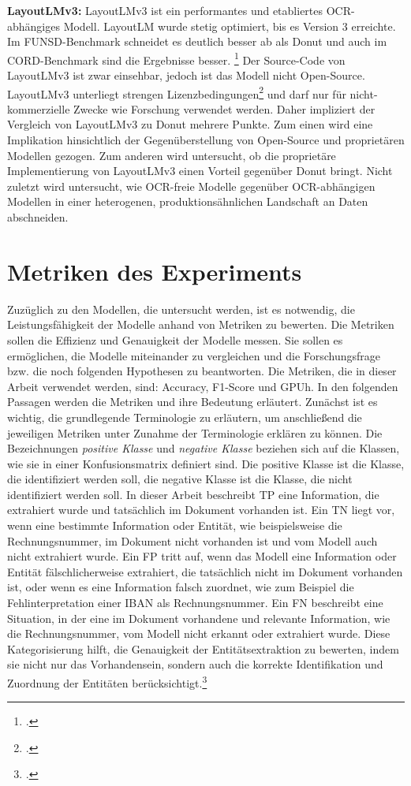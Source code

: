 \textbf{LayoutLMv3:} LayoutLMv3 ist ein performantes und etabliertes OCR-abhängiges Modell. LayoutLM wurde stetig optimiert, bis es Version 3 erreichte. Im FUNSD-Benchmark schneidet es deutlich besser ab als Donut und auch im CORD-Benchmark sind die Ergebnisse besser. \footcites[Vgl. dazu ausführlich][]{huang_layoutlmv3_2022} Der Source-Code von LayoutLMv3 ist zwar einsehbar, jedoch ist das Modell nicht Open-Source. LayoutLMv3 unterliegt strengen Lizenzbedingungen\footcites[Vgl.][]{noauthor_microsoftlayoutlmv3-base_2023} und darf nur für nicht-kommerzielle Zwecke wie Forschung verwendet werden. Daher impliziert der Vergleich von LayoutLMv3 zu Donut mehrere Punkte. Zum einen wird eine Implikation hinsichtlich der Gegenüberstellung von Open-Source und proprietären Modellen gezogen. Zum anderen wird untersucht, ob die proprietäre Implementierung von LayoutLMv3 einen Vorteil gegenüber Donut bringt. Nicht zuletzt wird untersucht, wie OCR-freie Modelle gegenüber OCR-abhängigen Modellen in einer heterogenen, produktionsähnlichen Landschaft an Daten abschneiden.

\section{Metriken des Experiments}
Zuzüglich zu den Modellen, die untersucht werden, ist es notwendig, die Leistungsfähigkeit der Modelle anhand von Metriken zu bewerten. Die Metriken sollen die Effizienz und Genauigkeit der Modelle messen. Sie sollen es ermöglichen, die Modelle miteinander zu vergleichen und die Forschungsfrage bzw. die noch folgenden Hypothesen zu beantworten. Die Metriken, die in dieser Arbeit verwendet werden, sind: Accuracy, F1-Score und \ac{GPUh}. In den folgenden Passagen werden die Metriken und ihre Bedeutung erläutert. Zunächst ist es wichtig, die grundlegende Terminologie zu erläutern, um anschließend die jeweiligen Metriken unter Zunahme der Terminologie erklären zu können. Die Bezeichnungen \emph{positive Klasse} und \emph{negative Klasse} beziehen sich auf die Klassen, wie sie in einer Konfusionsmatrix definiert sind. Die positive Klasse ist die Klasse, die identifiziert werden soll, die negative Klasse ist die Klasse, die nicht identifiziert werden soll. In dieser Arbeit beschreibt \ac{TP} eine Information, die extrahiert wurde und tatsächlich im Dokument vorhanden ist. Ein \ac{TN} liegt vor, wenn eine bestimmte Information oder Entität, wie beispielsweise die Rechnungsnummer, im Dokument nicht vorhanden ist und vom Modell auch nicht extrahiert wurde. Ein \ac{FP} tritt auf, wenn das Modell eine Information oder Entität fälschlicherweise extrahiert, die tatsächlich nicht im Dokument vorhanden ist, oder wenn es eine Information falsch zuordnet, wie zum Beispiel die Fehlinterpretation einer IBAN als Rechnungsnummer. Ein \ac{FN} beschreibt eine Situation, in der eine im Dokument vorhandene und relevante Information, wie die Rechnungsnummer, vom Modell nicht erkannt oder extrahiert wurde. Diese Kategorisierung hilft, die Genauigkeit der Entitätsextraktion zu bewerten, indem sie nicht nur das Vorhandensein, sondern auch die korrekte Identifikation und Zuordnung der Entitäten berücksichtigt.\footcites[Vgl.][]{pawan_confusion_2019}

